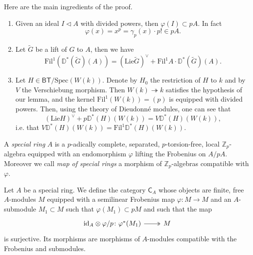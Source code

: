 \newpage
\begin{rem}[]\label{rem:A2Kisin}
	Here are the main ingredients of the proof.
\begin{enumerate}
	\item Given an ideal $I \triangleleft A$ with divided powers, then $\varphi(I) \subset pA$.
		In fact 
		\begin{equation*}
			\varphi(x) = x^p = \gamma_p(x) \cdot p! \in pA
		.\end{equation*}

	\item Let $\widetilde{G}$ be a lift of $G$ to $A$, then we have
		\begin{equation*}
			\mathrm{Fil}^1(\mathbb{D}^*(\widetilde{G})(A)) =
			( \mathrm{Lie} \widetilde{G} )^\vee +
			\mathrm{Fil}^1A \cdot \mathbb{D}^*(\widetilde{G})(A)
		.\end{equation*}
		
	\item Let $H \in \mathsf{BT}/\mathrm{Spec}(W(k))$. Denote by $H_0$ the restriction
		of $H$ to $k$ and by $V$ the Verschiebung morphism.
		Then $W(k) \twoheadrightarrow k$ satisfies the hypothesis of our lemma,
		and the kernel $\mathrm{Fil}^1(W(k)) = (p)$ is equipped with divided powers.
		Then, using the theory of Dieudonné modules, one can see that
		\begin{equation*}
			( \mathrm{Lie} H)^\vee + p \mathbb{D}^*(H)(W(k)) =
			V \mathbb{D}^{*}(H)(W(k))
		,\end{equation*}
		i.e. that
		$V \mathbb{D}^*(H)(W(k)) = \mathrm{Fil}^1 \mathbb{D}^*(H)(W(k))$.
\end{enumerate}
\end{rem}


\begin{defn}
	A {\em special ring} $A$ is a $p$-adically complete, separated, $p$-torsion-free,
	local $\mathbb{Z}_{p}$-algebra equipped with an endomorphism $\varphi$
	lifting the Frobenius on $A/pA$.
	Moreover we call {\em map of special rings} a morphism
	of $\mathbb{Z}_{p}$-algebras compatible with $\varphi$.
\end{defn}


\begin{defn}[]
	Let $A$ be a special ring. We define the category
	$\mathsf{C}_A$ whose objects are finite, free $A$-modules
	$M$ equipped with a semilinear Frobenius map $\varphi\colon M \to M$
	and an $A$-submodule $M_1 \subset M$ such that $\varphi(M_1) \subset pM$
	and such that the map
	\begin{equation*}
	\begin{tikzcd}[row sep = 0ex
		,/tikz/column 1/.append style={anchor=base east}
		,/tikz/column 2/.append style={anchor=base west}]
		\mathrm{id}_{ A }\otimes\varphi/p\colon 
		\varphi^*(M_1) \arrow[r, "", twoheadrightarrow] &
		M
	\end{tikzcd}
	\end{equation*} 
	is surjective.
	Its morphisms are morphisms of $A$-modules compatible with
	the Frobenius and submodules.
\end{defn}


